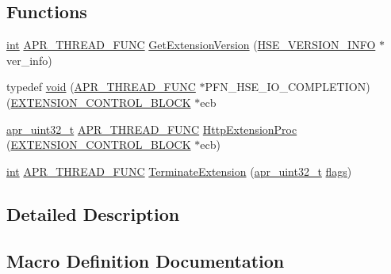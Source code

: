 \subsection*{Functions}
\begin{DoxyCompactItemize}
\item 
\hyperlink{pcre_8txt_a42dfa4ff673c82d8efe7144098fbc198}{int} \hyperlink{group__apr__platform_gade8f829f9bd98fd4386894acf72edd7c}{A\+P\+R\+\_\+\+T\+H\+R\+E\+A\+D\+\_\+\+F\+U\+NC} \hyperlink{group__MOD__ISAPI_gaf677bcfe89710289e38efd53b63fb480}{Get\+Extension\+Version} (\hyperlink{structHSE__VERSION__INFO}{H\+S\+E\+\_\+\+V\+E\+R\+S\+I\+O\+N\+\_\+\+I\+N\+FO} $\ast$ver\+\_\+info)
\item 
typedef \hyperlink{group__MOD__ISAPI_gacd6cdbf73df3d9eed42fa493d9b621a6}{void} (\hyperlink{group__apr__platform_gade8f829f9bd98fd4386894acf72edd7c}{A\+P\+R\+\_\+\+T\+H\+R\+E\+A\+D\+\_\+\+F\+U\+NC} $\ast$P\+F\+N\+\_\+\+H\+S\+E\+\_\+\+I\+O\+\_\+\+C\+O\+M\+P\+L\+E\+T\+I\+ON)(\hyperlink{structEXTENSION__CONTROL__BLOCK}{E\+X\+T\+E\+N\+S\+I\+O\+N\+\_\+\+C\+O\+N\+T\+R\+O\+L\+\_\+\+B\+L\+O\+CK} $\ast$ecb
\item 
\hyperlink{group__apr__platform_ga558548a135d8a816c4787250744ea147}{apr\+\_\+uint32\+\_\+t} \hyperlink{group__apr__platform_gade8f829f9bd98fd4386894acf72edd7c}{A\+P\+R\+\_\+\+T\+H\+R\+E\+A\+D\+\_\+\+F\+U\+NC} \hyperlink{group__MOD__ISAPI_ga12ba6002833b1e9913abd577eb92d13b}{Http\+Extension\+Proc} (\hyperlink{structEXTENSION__CONTROL__BLOCK}{E\+X\+T\+E\+N\+S\+I\+O\+N\+\_\+\+C\+O\+N\+T\+R\+O\+L\+\_\+\+B\+L\+O\+CK} $\ast$ecb)
\item 
\hyperlink{pcre_8txt_a42dfa4ff673c82d8efe7144098fbc198}{int} \hyperlink{group__apr__platform_gade8f829f9bd98fd4386894acf72edd7c}{A\+P\+R\+\_\+\+T\+H\+R\+E\+A\+D\+\_\+\+F\+U\+NC} \hyperlink{group__MOD__ISAPI_gae82810fe54da208b9386411489ba7ad5}{Terminate\+Extension} (\hyperlink{group__apr__platform_ga558548a135d8a816c4787250744ea147}{apr\+\_\+uint32\+\_\+t} \hyperlink{pcre_8txt_ad7a10cd81a384ff727296d05bb827806}{flags})
\end{DoxyCompactItemize}


\subsection{Detailed Description}


\subsection{Macro Definition Documentation}
